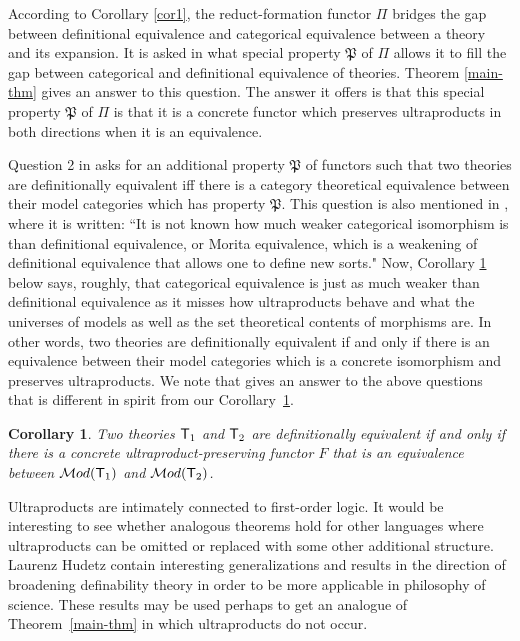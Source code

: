 \documentclass[12pt,leqno]{article}
\newcommand{\Pp}{\mbox{$\mathfrak P$}}
\newcommand{\T}{\mbox{\sf T}}
\newcommand{\Cat}{\mbox{$\mathcal Mod$}}
\newtheorem{cor}{Corollary}
\begin{document}
According to Corollary \ref{cor1}, the reduct-formation functor $\Pi$ bridges the gap between definitional equivalence and categorical equivalence between a theory and its expansion. It is asked in \cite[below Corollary 2]{Bsym} what special property $\Pp$ of $\Pi$ allows it to fill the gap between categorical and definitional equivalence of theories. Theorem \ref{main-thm} gives an answer to this question. The answer it offers is that this special property $\Pp$ of $\Pi$ is that it is a concrete functor which preserves ultraproducts in both directions when it is an equivalence.

Question 2 in \cite{BDis17} asks for an additional property $\Pp$ of functors
such that two theories are definitionally equivalent iff there is a category
theoretical equivalence between their model categories which has
property $\Pp$. This question is also mentioned in \cite[Note
23]{Weatherall}, where it is written: ``It is not known how much
weaker categorical isomorphism is than definitional equivalence, or
Morita equivalence, which is a weakening of definitional equivalence
that allows one to define new sorts." Now, Corollary \ref{dist-cor} below says, roughly, that 
categorical equivalence is just as much weaker than
definitional equivalence as it misses how ultraproducts behave and what the universes of models as well as the set theoretical contents of morphisms are.
In other words, two theories are definitionally equivalent if and only if there is an equivalence between their model categories which is a concrete isomorphism  and preserves ultraproducts. We note that \cite[Theorem 3]{HudetzDCE}
gives an answer to the above questions that is different
in spirit from our Corollary~\ref{dist-cor}.

\begin{cor}\label{dist-cor}
Two theories  $\T_1$ and $\T_2$ are definitionally equivalent if and
only if there is a  concrete ultraproduct-preserving functor $F$ that is an
equivalence between $\Cat(\T_1)$ and $\Cat(\T_2)$.
\end{cor}


\bigskip
Ultraproducts are intimately connected to first-order logic. It
would be interesting to see whether analogous theorems hold for
other languages where ultraproducts can be omitted or replaced with
some other additional structure. Laurenz Hudetz \cite{HudetzDCE,
Hudetz} contain interesting generalizations and results in the
direction of broadening definability theory in order to be more
applicable in philosophy of science. These results may be used
perhaps to get an analogue of Theorem~\ref{main-thm} in which
ultraproducts do not occur. 
\end{document}
